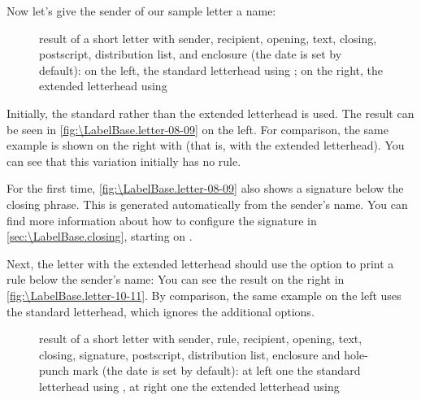 \begin{Example}
  Now let's give the sender of our sample letter a name:
  \begin{figure}
    \centering
    \quad
    \caption[{Example: letter with sender, recipient, opening, text, closing,
      postscript, distribution list, and enclosure}]
    {result of a short letter with sender, recipient, opening, text, closing,
      postscript, distribution list, and enclosure (the date is set by
      default): on the left, the standard letterhead using
      ; on the right, the
      extended letterhead using }
    \label{fig:\LabelBase.letter-08-09}
  \end{figure}
  Initially, the standard rather than the extended letterhead is used. The
  result can be seen in \autoref{fig:\LabelBase.letter-08-09} on the left. For
  comparison, the same example is shown on the right with
   (that is, with the extended
  letterhead). You can see that this variation initially has no rule.

  For the first time, \autoref{fig:\LabelBase.letter-08-09} also shows a
  signature below the closing phrase. This is generated automatically from the
  sender's name. You can find more information about how to configure the
  signature in \autoref{sec:\LabelBase.closing}, starting on
  .

  Next, the letter with the extended letterhead should use the
   option to print a rule below the sender's name:%
  You can see the result on the right in
  \autoref{fig:\LabelBase.letter-10-11}. By comparison, the same example on
  the left uses the standard letterhead, which ignores the additional options.
  \begin{figure}
    \centering
    \quad
    \caption[{Example: letter with sender, rule, recipient,
      opening, text, closing, signature, postscript, distribution list,
      enclosure, and hole-punch mark}]
    {result of a short letter with sender, rule, recipient,
      opening, text, closing, signature, postscript, distribution list,
      enclosure and hole-punch mark (the date is set by default):
      at left one the standard letterhead using
      , at right one the extended letterhead
      using }
    \label{fig:\LabelBase.letter-10-11}
  \end{figure}
\end{Example}

